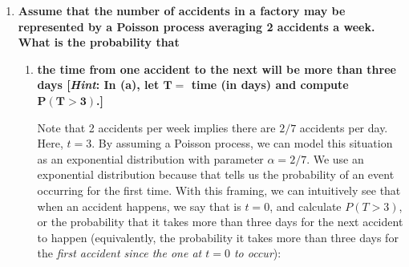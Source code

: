 \documentclass[10pt, oneside]{article}
\begin{document}
\begin{enumerate}[label=9.\arabic*]
\begin{enumerate}
	An important note here is that it is not readily apparent to us what values of $x,y$ render this mixture of normal distributions to have a uni- or bimodal distribution.\footnote{See this discussion on Cross Validated for more: \url{https://stats.stackexchange.com/questions/416204/why-is-a-mixture-of-two-normally-distributed-variables-only-bimodal-if-their-mea}}. We need not concern ourselves with the general case of when unimodality holds, however; we only ask what happens if we now impose the condition that $\mu_1 = \mu_2$. Substitute each $\mu_1, \mu_2$ with $\mu$ to get
	
	\[ \frac{d h(z)}{dz} = \frac{1}{\sqrt{2\pi}} \bigg( \frac{p}{ \sigma^3_1} (x-\mu) \exp  \bigg[ -\frac{1}{2} \bigg( \frac{x-\mu}{\sigma_1} \bigg)^2 \bigg] + \bigg( \frac{1-p}{ \sigma^3_2} \bigg) (y-\mu) \exp  \bigg[ -\frac{1}{2} \bigg( \frac{y-\mu}{\sigma_2} \bigg)^2 \bigg] \bigg) = 0 \]
	
	Since the exponential terms will never go to zero exactly, we need only look at the $x - \mu, y - \mu$ terms to conclude that $dh(z) / dz$ if and only if $x = y = \mu$ under the aforementioned constraint. Therefore, if $\mu_1 = \mu_2$, then the pdf of $Z$ is unimodal.
	
	\end{enumerate}

\item  \begin{tcolorbox}[
  colback=Cerulean!5!white,
  colframe=Cerulean!75!black]
\textbf{Assume that the number of accidents in a factory may be represented by a Poisson process averaging 2 accidents a week. What is the probability that}
\end{tcolorbox}

	\begin{enumerate}
	\item  \begin{tcolorbox}[
	  colback=Cerulean!5!white,
	  colframe=Cerulean!75!black]
	\textbf{the time from one accident to the next will be more than three days [\textit{Hint}: In (a), let $\bm{T =}$ time (in days) and compute $\bm{P(T > 3)}$.]}
	\end{tcolorbox}
	
	Note that 2 accidents per week implies there are $2/7$ accidents per day. Here, $t = 3$. By assuming a Poisson process, we can model this situation as an exponential distribution with parameter $\alpha = 2/7$. We use an exponential distribution because that tells us the probability of an event occurring for the first time. With this framing, we can intuitively see that when an accident happens, we say that is $t = 0$, and calculate $P(T > 3)$, or the probability that it takes more than three days for the next accident to happen (equivalently, the probability it takes more than three days for the \textit{first accident since the one at $t=0$ to occur}):
	

\end{enumerate}
\end{enumerate}
\end{document}
